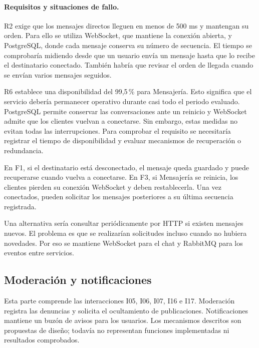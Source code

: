 \documentclass[12pt,a4paper]{article}
\begin{document}
\paragraph{Requisitos y situaciones de fallo.}

R2 exige que los mensajes directos lleguen en menos de 500 ms y
mantengan su orden. Para ello se utiliza WebSocket, que mantiene
la conexión abierta, y PostgreSQL, donde cada mensaje conserva
su número de secuencia. El tiempo se comprobaría midiendo desde
que un usuario envía un mensaje hasta que lo recibe el destinatario
conectado. También habría que revisar el orden de llegada cuando
se envían varios mensajes seguidos.

R6 establece una disponibilidad del 99,5\,\% para Mensajería.
Esto significa que el servicio debería permanecer operativo durante
casi todo el periodo evaluado. PostgreSQL permite conservar las
conversaciones ante un reinicio y WebSocket admite que los clientes
vuelvan a conectarse. Sin embargo, estas medidas no evitan todas
las interrupciones. Para comprobar el requisito se necesitaría
registrar el tiempo de disponibilidad y evaluar mecanismos de
recuperación o redundancia.

En F1, si el destinatario está desconectado, el mensaje queda guardado
y puede recuperarse cuando vuelva a conectarse. En F3, si Mensajería
se reinicia, los clientes pierden su conexión WebSocket y deben
restablecerla. Una vez conectados, pueden solicitar los mensajes
posteriores a su última secuencia registrada.

Una alternativa sería consultar periódicamente por HTTP si existen
mensajes nuevos. El problema es que se realizarían solicitudes incluso
cuando no hubiera novedades. Por eso se mantiene WebSocket para
el chat y RabbitMQ para los eventos entre servicios.


\subsection{Moderación y notificaciones}

Esta parte comprende las interacciones I05, I06, I07, I16 e I17.
Moderación registra las denuncias y solicita el ocultamiento de
publicaciones. Notificaciones mantiene un buzón de avisos para
los usuarios. Los mecanismos descritos son propuestas de diseño;
todavía no representan funciones implementadas ni resultados
comprobados.
\end{document}
